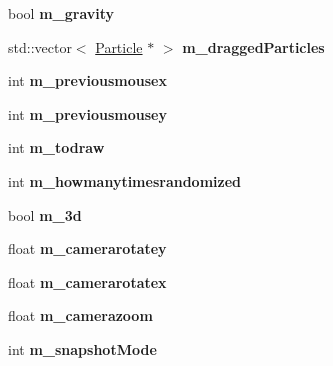 \begin{DoxyCompactItemize}
\item 
\hypertarget{classWorld_a78803ecd09fbfff6f9718a3336878649}{bool {\bfseries m\-\_\-gravity}}\label{classWorld_a78803ecd09fbfff6f9718a3336878649}

\item 
\hypertarget{classWorld_ac917a625a89a72df932fda9854f64810}{std\-::vector$<$ \hyperlink{classParticle}{Particle} $\ast$ $>$ {\bfseries m\-\_\-dragged\-Particles}}\label{classWorld_ac917a625a89a72df932fda9854f64810}

\item 
\hypertarget{classWorld_adea44f96d6180e72ff2295803b5cce59}{int {\bfseries m\-\_\-previousmousex}}\label{classWorld_adea44f96d6180e72ff2295803b5cce59}

\item 
\hypertarget{classWorld_ab5ec42bbbfba3521bcd6cd5677815fbc}{int {\bfseries m\-\_\-previousmousey}}\label{classWorld_ab5ec42bbbfba3521bcd6cd5677815fbc}

\item 
\hypertarget{classWorld_a28a5a1395a3bcebf7998b94a943663aa}{int {\bfseries m\-\_\-todraw}}\label{classWorld_a28a5a1395a3bcebf7998b94a943663aa}

\item 
\hypertarget{classWorld_a33c2781113b1aec49f85e2394eedba1b}{int {\bfseries m\-\_\-howmanytimesrandomized}}\label{classWorld_a33c2781113b1aec49f85e2394eedba1b}

\item 
\hypertarget{classWorld_a632d84e10772c852923815311c431bfe}{bool {\bfseries m\-\_\-3d}}\label{classWorld_a632d84e10772c852923815311c431bfe}

\item 
\hypertarget{classWorld_a897ea3cc1bafd8b58ca2ef3ecfa7e802}{float {\bfseries m\-\_\-camerarotatey}}\label{classWorld_a897ea3cc1bafd8b58ca2ef3ecfa7e802}

\item 
\hypertarget{classWorld_ae99f08429ff35eb072fc76885637464e}{float {\bfseries m\-\_\-camerarotatex}}\label{classWorld_ae99f08429ff35eb072fc76885637464e}

\item 
\hypertarget{classWorld_a5a558d51a33eca665118159294a69568}{float {\bfseries m\-\_\-camerazoom}}\label{classWorld_a5a558d51a33eca665118159294a69568}

\item 
\hypertarget{classWorld_ab63c82cf6d69d44d88b9217a92ab515c}{int {\bfseries m\-\_\-snapshot\-Mode}}\label{classWorld_ab63c82cf6d69d44d88b9217a92ab515c}


\end{DoxyCompactItemize}
